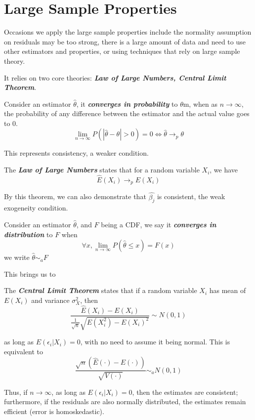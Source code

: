 \section{Large Sample Properties}
Occasions we apply the large sample properties include the normality assumption on residuals may be too strong, there is a large amount of data and need to use other estimators and properties, or using techniques that rely on large sample theory.

It relies on two core theories: \textbf{\textit{Law of Large Numbers, Central Limit Theorem}}.

\begin{definition}
    Consider an estimator $\hat{\theta}$, it \textbf{\textit{converges in probability}} to $\theta$m, when as $n \to \infty$, the probability of any difference between the estimator and the actual value goes to $0$.
    $$\lim_{n \to \infty} P(|\hat{\theta} - \theta| > 0) = 0 \iff \hat{\theta} \to_p \theta$$
\end{definition}
This represents consistency, a weaker condition.

\begin{theorem}
    The \textbf{\textit{Law of Large Numbers}} states that for a random variable $X_i$, we have
    $$\hat{E}(X_i) \to_p E(X_i)$$
\end{theorem}
By this theorem, we can also demonstrate that $\hat{\beta_j}$ is consistent, the weak exogeneity condition.

\begin{definition}
    Consider an estimator $\hat{\theta}$, and $F$ being a CDF, we say it \textbf{\textit{converges in distribution}} to $F$ when
    $$\forall x, \lim_{n \to \infty} P(\hat{\theta} \le x) = F(x)$$
    we write $\hat{\theta} \sim_a F$
\end{definition}

This brings us to
\begin{theorem}
    The \textbf{\textit{Central Limit Theorem}} states that if a random variable $X_i$ has mean of $E(X_i)$ and variance $\sigma_X^2$, then
    $$\frac{\hat{E}(X_i) - E(X_i)}{\frac{1}{\sqrt{n}} \sqrt{E(X_i^2) - E(X_i)^2}} \sim N(0, 1)$$
\end{theorem}
as long as $E(\epsilon_i | X_i) = 0$, with no need to assume it being normal. This is equivalent to
$$\frac{\sqrt{n}(\hat{E}(\cdot) - E(\cdot))}{\sqrt{V(\cdot)}} \sim_a N(0, 1)$$

Thus, if $n \to \infty$, as long as $E(\epsilon_i | X_i) = 0$, then the estimates are consistent; furthermore, if the residuals are also normally distributed, the estimates remain efficient (error is homoskedastic).

\newpage